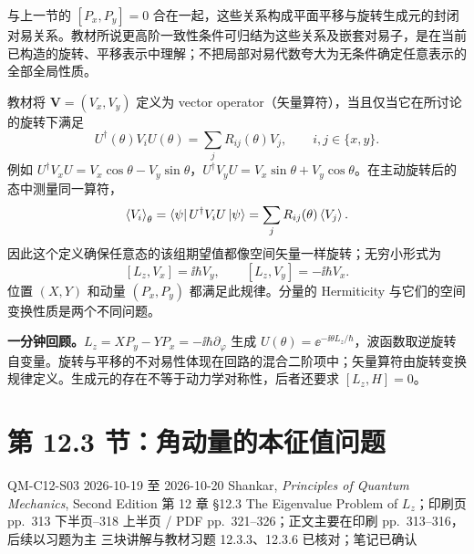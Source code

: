 与上一节的 $[P_x,P_y]=0$ 合在一起，这些关系构成平面平移与旋转生成元的封闭对易关系。教材所说更高阶一致性条件可归结为这些关系及嵌套对易子，是在当前已构造的旋转、平移表示中理解；不把局部对易代数夸大为无条件确定任意表示的全部全局性质。


教材将 $\mathbf V=(V_x,V_y)$ 定义为 vector operator（矢量算符），当且仅当它在所讨论的旋转下满足
\begin{equation}
  \boxed{U^\dagger(\theta)V_iU(\theta)=\sum_jR_{ij}(\theta)V_j},
  \qquad i,j\in\{x,y\}.
  \label{eq:QM-C12-S02-vector-operator}
\end{equation}
例如 $U^\dagger V_xU=V_x\cos\theta-V_y\sin\theta$，$U^\dagger V_yU=V_x\sin\theta+V_y\cos\theta$。在主动旋转后的态中测量同一算符，
\begin{equation}
  \left\langle V_i \right\rangle_\theta
  =\left\langle \psi\right| U^\dagger V_iU\left|\psi\right\rangle
  =\sum_jR_{ij}(\theta)\left\langle V_j \right\rangle.
\end{equation}
因此这个定义确保任意态的该组期望值都像空间矢量一样旋转；无穷小形式为
\begin{equation}
  \boxed{[L_z,V_x]=\ii\hbar V_y,\qquad
         [L_z,V_y]=-\ii\hbar V_x}.
\end{equation}
位置 $(X,Y)$ 和动量 $(P_x,P_y)$ 都满足此规律。分量的 Hermiticity 与它们的空间变换性质是两个不同问题。


\textbf{一分钟回顾。}$L_z=XP_y-YP_x=-\ii\hbar\partial_\varphi$ 生成 $U(\theta)=\ee^{-\ii\theta L_z/\hbar}$，波函数取逆旋转自变量。旋转与平移的不对易性体现在回路的混合二阶项中；矢量算符由旋转变换规律定义。生成元的存在不等于动力学对称性，后者还要求 $[L_z,H]=0$。

\section{第 12.3 节：角动量的本征值问题}
\label{section:QM-C12-S03}
\studymeta
  {QM-C12-S03}
  {2026-10-19 至 2026-10-20}
  {Shankar, \textit{Principles of Quantum Mechanics}, Second Edition}
  {第 12 章 \S 12.3 The Eigenvalue Problem of $L_z$；印刷页 pp.~313 下半页--318 上半页 / PDF pp.~321--326；正文主要在印刷 pp.~313--316，后续以习题为主}
  {三块讲解与教材习题 12.3.3、12.3.6 已核对；笔记已确认}

